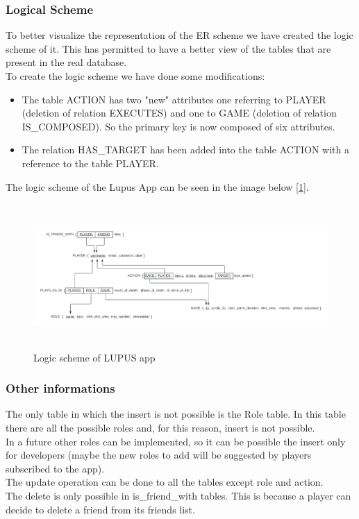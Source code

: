 \subsubsection{Logical Scheme}
To better visualize the representation of the ER scheme we have created the logic scheme of it. This has permitted to have a better view of the tables that are present in the real database. \\
To create the logic scheme we have done some modifications:
\begin{itemize}
    \item The table ACTION has two "new" attributes one referring to PLAYER (deletion of relation EXECUTES) and one to GAME (deletion of relation IS\_COMPOSED). So the primary key is now composed of six attributes.
    \item The relation HAS\_TARGET has been added into the table ACTION with a reference to the table PLAYER.
\end{itemize}

The logic scheme of the Lupus App can be seen in the image below [\ref{fig:logic_scheme}].
\begin{figure}[htbp] 
    \centering
    \includegraphics[width=\textwidth, height=5.5cm]{images/scheme/logic_scheme.jpeg}
    \caption{Logic scheme of LUPUS app}
    \label{fig:logic_scheme}
\end{figure}


\subsubsection{Other informations}
The only table in which the insert is not possible is the Role table. In this table there are all the possible roles and, for this reason, insert is not possible. \\
In a future other roles can be implemented, so it can be possible the insert only for developers (maybe the new roles to add will be suggested by players subscribed to the app). \\
The update operation can be done to all the tables except role and action.\\
The delete is only possible in is\_friend\_with tables. This is because a player can decide to delete a friend from its friends list.

